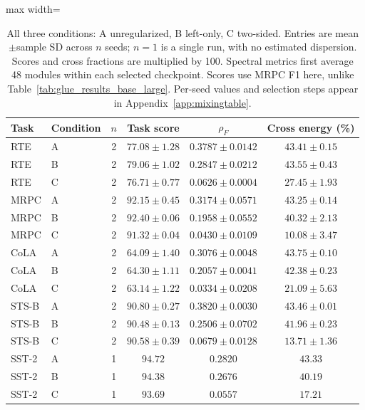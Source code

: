 \documentclass{article}
\begin{document}
\begin{table}[t]
\centering
\caption{All three conditions: A unregularized, B left-only, C two-sided. Entries are mean$\pm$sample SD across $n$ seeds; $n=1$ is a single run, with no estimated dispersion. Scores and cross fractions are multiplied by 100. Spectral metrics first average 48 modules within each selected checkpoint. Scores use MRPC F1 here, unlike Table~\ref{tab:glue_results_base_large}. Per-seed values and selection steps appear in Appendix~\ref{app:mixingtable}.}
\label{tab:mixingmain}
\begin{adjustbox}{max width=\linewidth}
\begin{tabular}{llcccc}
\toprule
Task & Condition & $n$ & Task score & $\rho_F$ & Cross energy (\%) \\
\midrule
RTE & A & 2 & $77.08 \pm 1.28$ & $0.3787 \pm 0.0142$ & $43.41 \pm 0.15$ \\
RTE & B & 2 & $79.06 \pm 1.02$ & $0.2847 \pm 0.0212$ & $43.55 \pm 0.43$ \\
RTE & C & 2 & $76.71 \pm 0.77$ & $0.0626 \pm 0.0004$ & $27.45 \pm 1.93$ \\
\midrule
MRPC & A & 2 & $92.15 \pm 0.45$ & $0.3174 \pm 0.0571$ & $43.25 \pm 0.14$ \\
MRPC & B & 2 & $92.40 \pm 0.06$ & $0.1958 \pm 0.0552$ & $40.32 \pm 2.13$ \\
MRPC & C & 2 & $91.32 \pm 0.04$ & $0.0430 \pm 0.0109$ & $10.08 \pm 3.47$ \\
\midrule
CoLA & A & 2 & $64.09 \pm 1.40$ & $0.3076 \pm 0.0048$ & $43.75 \pm 0.10$ \\
CoLA & B & 2 & $64.30 \pm 1.11$ & $0.2057 \pm 0.0041$ & $42.38 \pm 0.23$ \\
CoLA & C & 2 & $63.14 \pm 1.22$ & $0.0334 \pm 0.0208$ & $21.09 \pm 5.63$ \\
\midrule
STS-B & A & 2 & $90.80 \pm 0.27$ & $0.3820 \pm 0.0030$ & $43.46 \pm 0.01$ \\
STS-B & B & 2 & $90.48 \pm 0.13$ & $0.2506 \pm 0.0702$ & $41.96 \pm 0.23$ \\
STS-B & C & 2 & $90.58 \pm 0.39$ & $0.0679 \pm 0.0128$ & $13.71 \pm 1.36$ \\
\midrule
SST-2 & A & 1 & $94.72$ & $0.2820$ & $43.33$ \\
SST-2 & B & 1 & $94.38$ & $0.2676$ & $40.19$ \\
SST-2 & C & 1 & $93.69$ & $0.0557$ & $17.21$ \\
\bottomrule
\end{tabular}
\end{adjustbox}
\end{table}
\end{document}
